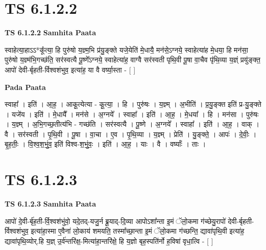 \documentclass[17pt]{extarticle}
\begin{document}
\section*{ TS 6.1.2.2 }

\textbf{TS 6.1.2.2 } \newline
\textbf{Samhita Paata} \newline

स्वाहेत्या॒हाऽऽ*कू᳚त्या॒ हि पुरु॑षो य॒ज्ञ्म॒भि प्र॑यु॒ङ्क्ते यजे॒येति॑ मे॒धायै॒ मन॑से॒ऽग्नये॒ स्वाहेत्या॑ह मे॒धया॒ हि मन॑सा॒ पुरु॑षो य॒ज्ञ्म॑भि॒गच्छ॑ति॒ सर॑स्वत्यै पू॒ष्णे᳚ऽग्नये॒ स्वाहेत्या॑ह॒ वाग्वै सर॑स्वती पृथि॒वी पू॒षा वा॒चैव पृ॑थि॒व्या य॒ज्ञ्ं प्रयु॑ङ्क्त॒ आपो॑ देवी-र्बृहती-र्विश्वशंभुव॒ इत्या॑ह॒ या वै वर्ष्या॒स्ता - [  ] \newline

\textbf{Pada Paata} \newline

स्वाहा᳚ । इति॑ । आ॒ह॒ । आकू॒त्येत्या - कू॒त्या॒ । हि । पुरु॑षः । य॒ज्ञ्म् । अ॒भीति॑ । प्र॒यु॒ङ्क्त इति॑ प्र-यु॒ङ्क्ते । यजे॑य । इति॑ । मे॒धायै᳚ । मन॑से । अ॒ग्नये᳚ । स्वाहा᳚ । इति॑ । आ॒ह॒ । मे॒धया᳚ । हि । मन॑सा । पुरु॑षः । य॒ज्ञ्म् । अ॒भि॒गच्छ॒तीत्य॑भि - गच्छ॑ति । सर॑स्वत्यै । पू॒ष्णे । अ॒ग्नये᳚ । स्वाहा᳚ । इति॑ । आ॒ह॒ । वाक् । वै । सर॑स्वती । पृ॒थि॒वी । पू॒षा । वा॒चा । ए॒व । पृ॒थि॒व्या । य॒ज्ञ्म् । प्रेति॑ । यु॒ङ्क्ते॒ । आपः॑ । दे॒वीः॒ । बृ॒ह॒तीः॒ । वि॒श्व॒श॒भुं॒व॒ इति॑ विश्व-श॒भुं॒वः॒ । इति॑ । आ॒ह॒ । याः । वै । वर्ष्याः᳚ । ताः ।  \newline




\section*{ TS 6.1.2.3 }

\textbf{TS 6.1.2.3 } \newline
\textbf{Samhita Paata} \newline

आपो॑ दे॒वी-र्बृ॑ह॒ती-र्वि॒श्वश॑भुंवो॒ यदे॒तद्-यजु॒र्न ब्रू॒याद्-दि॒व्या आपोऽशा᳚न्ता इ॒मं ॅलो॒कमा ग॑च्छेयु॒रापो॑ देवी-र्बृहती-र्विश्वशंभुव॒ इत्या॑हा॒स्मा ए॒वैना॑ लो॒काय॑ शमयति॒ तस्मा᳚च्छा॒न्ता इ॒मं ॅलो॒कमा ग॑च्छन्ति॒ द्यावा॑पृथि॒वी इत्या॑ह॒ द्यावा॑पृथि॒व्योर्.हि य॒ज्ञ् उ॒र्व॑न्तरि॑क्ष॒-मित्या॑हा॒न्तरि॑क्षे॒ हि य॒ज्ञो बृह॒स्पति॑र्नो ह॒विषा॑ वृधा॒त्वि - [  ] \newline
\end{document}
